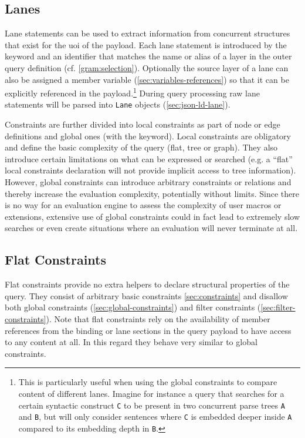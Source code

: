 \documentclass[11pt,a4paper]{report}
\newcommand{\iqlType}[1]{\texttt{\iqlns#1}}
\begin{document}
\subsection{Lanes}
\label{sec:lanes}
\noindent Lane statements can be used to extract information from concurrent structures that exist for the \ac{uoi} of the payload.
Each lane statement is introduced by the  keyword and an identifier that matches the name or alias of a layer in the outer query definition (cf. \cref{gram:selection}).
Optionally the source layer of a lane can also be assigned a member variable (\ref{sec:variables-references}) so that it can be explicitly referenced in the payload.\footnote{This is particularly useful when using the global constraints to compare content of different lanes. Imagine for instance a query that searches for a certain syntactic construct \texttt{C} to be present in two concurrent parse trees \texttt{A} and \texttt{B}, but will only consider sentences where \texttt{C} is embedded deeper inside \texttt{A} compared to its embedding depth in \texttt{B}.}
During query processing raw lane statements will be parsed into \iqlType{Lane} objects (\ref{sec:json-ld-lane}).


Constraints are further divided into local constraints as part of node or edge definitions and global ones (with the  keyword). 
Local constraints are obligatory and define the basic complexity of the query (flat, tree or graph). 
They also introduce certain limitations on what can be expressed or searched (e.g. a ``flat'' local constraints declaration will not provide implicit access to tree information). 
However, global constraints can introduce arbitrary constraints or relations and thereby increase the evaluation complexity, potentially without limits. 
Since there is no way for an evaluation engine to assess the complexity of user macros or extensions, extensive use of global constraints could in fact lead to extremely slow searches or even create situations where an evaluation will never terminate at all.

\subsection{Flat Constraints}
\label{sec:flat-constraints}

Flat constraints provide no extra helpers to declare structural properties of the query. 
They consist of arbitrary basic constraints \cref{sec:constraints} and disallow both global constraints (\ref{sec:global-constraints}) and filter constraints (\ref{sec:filter-constraints}). 
Note that flat constraints rely on the availability of member references from the binding or lane sections in the query payload to have access to any content at all.
In this regard they behave very similar to global constraints.
\end{document}
